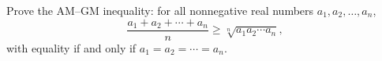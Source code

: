 Prove the AM--GM inequality: for all nonnegative real numbers $a_1,a_2,\dots,a_n$,
\[\dfrac{a_1+a_2+\cdots+a_n}{n}\ge\sqrt[n]{a_1a_2\cdots a_n},\]
with equality if and only if $a_1=a_2=\cdots=a_n$.
